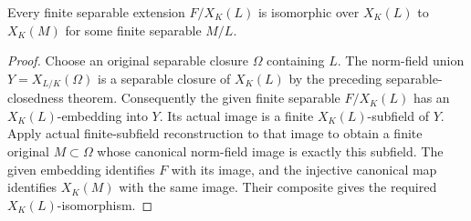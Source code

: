 \begin{lemma}
\label{fw:separable-finite-essential-image}
\leanok
Every finite separable extension $F/X_K(L)$ is isomorphic over
$X_K(L)$ to $X_K(M)$ for some finite separable $M/L$.
\end{lemma}
\begin{proof}
Choose an original separable closure $\Omega$ containing $L$.
The norm-field union $Y=X_{L/K}(\Omega)$ is a separable closure
of $X_K(L)$ by the preceding separable-closedness theorem.
Consequently the given finite separable $F/X_K(L)$ has an
$X_K(L)$-embedding into $Y$. Its actual image is a finite
$X_K(L)$-subfield of $Y$. Apply actual finite-subfield
reconstruction to that image to obtain a finite original
$M\subset\Omega$ whose canonical norm-field image is exactly
this subfield. The given embedding identifies $F$ with its image,
and the injective canonical map identifies $X_K(M)$ with the same
image. Their composite gives the required $X_K(L)$-isomorphism.
\end{proof}

